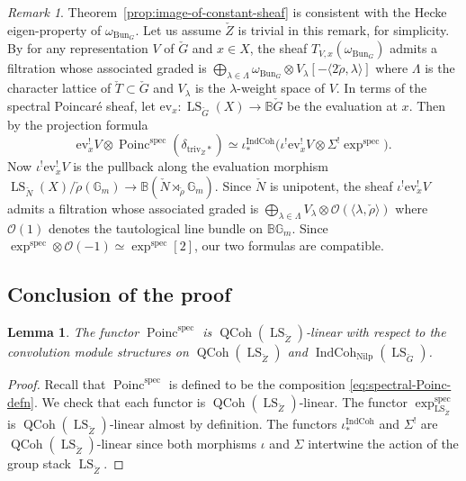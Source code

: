 \documentclass[11pt]{amsart}
\newcommand{\bG}{\mathbb{G}}
\newcommand{\B}{\mathbb{B}}
\newcommand{\cO}{{\mathcal O}}
\newcommand{\triv}{\mathrm{triv}}
\newcommand{\spec}{\mathrm{spec}}
\newcommand{\Bun}{{\mathrm{Bun}}}
\newcommand{\Poinc}{\operatorname{Poinc}}
\newcommand{\Nilp}{\mathrm{Nilp}}
\DeclareMathOperator{\QCoh}{QCoh}
\DeclareMathOperator{\IndCoh}{IndCoh}
\DeclareMathOperator{\LS}{LS}
\newtheorem{lemma}[thm]{Lemma}
\theoremstyle{remark}
\newtheorem*{remark}{Remark}
\theoremstyle{definition}
\begin{document}
\begin{remark}
    Theorem~\ref{prop:image-of-constant-sheaf} is consistent with the Hecke eigen-property of $\omega_{\Bun_G}$. Let us assume $\check Z$ is trivial in this remark, for simplicity. By \cite[Theorem~5]{derived-satake} for any representation $V$ of $\check G$ and $x\in X$, the sheaf $T_{V,x}(\omega_{\Bun_G})$ admits a filtration whose associated graded is $\bigoplus_{\lambda\in\Lambda}\omega_{\Bun_G}\otimes V_\lambda[-\langle2\check\rho,\lambda\rangle]$ where $\Lambda$ is the character lattice of $\check T\subset \check G$ and $V_\lambda$ is the $\lambda$-weight space of $V$. In terms of the spectral Poincar\'e sheaf, let $\mathrm{ev}_x\colon\LS_{\check G}(X)\to\mathbb B\check G$ be the evaluation at $x$. Then by the projection formula
    \[
        \mathrm{ev}_x^!V\otimes\Poinc^\spec(\delta_{\triv_{\check Z}*})\simeq\iota^{\IndCoh}_*\big(\iota^!\mathrm{ev}_x^!V\otimes\Sigma^!\exp^\spec\big).
    \]
    Now $\iota^!\mathrm{ev}^!_xV$ is the pullback along the evaluation morphism $\LS_{\check N}(X)/\check\rho(\bG_m)\to\mathbb B(\check N\rtimes_{\check\rho}\bG_m)$. Since $\check N$ is unipotent, the sheaf $\iota^!\mathrm{ev}^!_xV$ admits a filtration whose associated graded is $\bigoplus_{\lambda\in\Lambda}V_\lambda\otimes\cO(\langle\lambda,\check\rho\rangle)$ where $\cO(1)$ denotes the tautological line bundle on $\B\bG_m$. Since $\exp^\spec\otimes\cO(-1)\simeq\exp^\spec[2]$, our two formulas are compatible.
\end{remark}
\subsection{Conclusion of the proof}\label{subsec:main-proof}
\begin{lemma}\label{lem:spectral-poincare-is-linear}
    The functor $\Poinc^\spec$ is $\QCoh(\LS_{\check Z})$-linear with respect to the convolution module structures on $\QCoh(\LS_{\check Z})$ and $\IndCoh_\Nilp(\LS_{\check G})$.
\end{lemma}
\begin{proof}
    Recall that $\Poinc^\spec$ is defined to be the composition \eqref{eq:spectral-Poinc-defn}. We check that each functor is $\QCoh(\LS_{\check Z})$-linear. The functor
    $\exp^\spec_{\LS_{\check Z}}$ is $\QCoh(\LS_{\check Z})$-linear almost by definition. The functors $\iota_*^{\IndCoh}$ and $\Sigma^!$ are $\QCoh(\LS_{\check Z})$-linear since both morphisms $\iota$ and $\Sigma$ intertwine the action of the group stack $\LS_{\check Z}$.
\end{proof}
\end{document}
